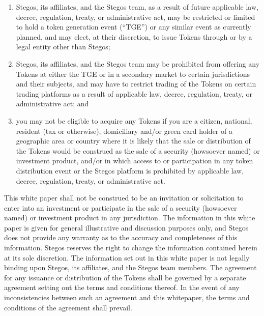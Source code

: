 \documentclass[8pt,fleqn,openany]{book}
\begin{document}
{\begin{enumerate}[label=(\alph*)]
			\item Stegos, its affiliates, and the Stegos team, as a result of future applicable law, decree, regulation, treaty, or administrative act, may be restricted or limited to hold a token generation event (“TGE”) or any similar event as currently planned, and may elect, at their discretion, to issue Tokens through or by a legal entity other than Stegos; 
			
			\item Stegos, its affiliates, and the Stegos team may be prohibited from offering any Tokens at either the TGE or in a secondary market to certain jurisdictions and their subjects, and may have to restrict trading of the Tokens on certain trading platforms as a result of applicable law, decree, regulation, treaty, or administrative act; and 
			
			\item you may not be eligible to acquire any Tokens if you are a citizen, national, resident (tax or otherwise), domiciliary and/or green card holder of a geographic area or country where it is likely that the sale or distribution of the Tokens would be construed as the sale of a security (howsoever named) or investment product, and/or in which access to or participation in any token distribution event or the Stegos platform is prohibited by applicable law, decree, regulation, treaty, or administrative act. 
			
		\end{enumerate}
		
		This white paper shall not be construed to be an invitation or solicitation to enter into an investment or participate in the sale of a security (howsoever named) or investment product in any jurisdiction. The information in this white paper is given for general illustrative and discussion purposes only, and Stegos does not provide any warranty as to the accuracy and completeness of this information. Stegos reserves the right to change the information contained herein at its sole discretion. The information set out in this white paper is not legally binding upon Stegos, its affiliates, and the Stegos team members. The agreement for any issuance or distribution of the Tokens shall be governed by a separate agreement setting out the terms and conditions thereof. In the event of any inconsistencies between such an agreement and this whitepaper, the terms and conditions of the agreement shall prevail. 
		
		\newpage \appendix
		\addappheadtotoc
		
}
\end{document}
